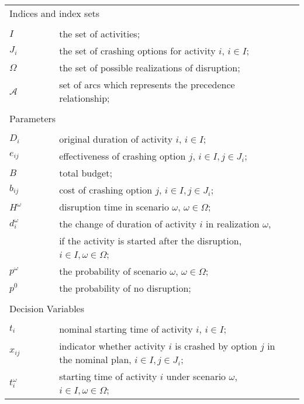 \documentclass[11pt]{article}
\begin{document}
	\begin{table}[H]
		\begin{tabular}{ l l l l }
			\multicolumn{4}{l}{Indices and index sets} \\
			\\
			\(I\) & \(\qquad\) & the set of activities;&\\
			\(J_i\) & \(\qquad\) & the set of crashing options for activity \(i\), \(i \in I\);&\\
			\(\Omega\) & \(\qquad\) & the set of possible realizations of disruption;&\\
			\(\mathcal{A}\) &\(\qquad\) & set of arcs which represents the precedence relationship;&\\
			\\
			\multicolumn{4}{l}{Parameters} \\
			\\
			\(D_{i}\)& \(\qquad\) & original duration of activity \(i\), \(i \in I\);&\\
			\(e_{ij}\) & \(\qquad\) & effectiveness of crashing option \(j\), \(i \in I, j \in J_i\);&\\
			\(B\) & \(\qquad\) & total budget;&\\
			\(b_{ij}\) & \(\qquad\) & cost of crashing option \(j\), \(i \in I, j \in J_i\);&\\
			\(H^\omega\) &\(\qquad\) & disruption time in scenario \(\omega\), \(\omega \in \Omega\);&\\
			\(d_{i}^\omega\) & \(\qquad\)&the change of duration of activity \(i\) in realization \(\omega\), &\\
			& \(\qquad\) & if the activity is started after the disruption, \(i \in I, \omega \in \Omega\);& \\
			\(p^\omega\) & \(\qquad\) & the probability of scenario \(\omega\), \(\omega \in \Omega\);& \\
			\(p^0\) & \(\qquad\) & the probability of no disruption;& \\
			\\
			\multicolumn{4}{l}{Decision Variables}\\
			\\
			\(t_{i}\) & \(\qquad\) & nominal starting time of activity \(i\), \(i \in I\);&\\
			\(x_{ij}\) & \(\qquad\) & indicator whether activity \(i\) is crashed by option \(j\) in the nominal plan, \(i \in I, j \in J_i\); &\\
			\(t_{i}^\omega\) & \(\qquad\) & starting time of activity \(i\) under scenario \(\omega\), \(i \in I, \omega \in \Omega\);&\\

\end{tabular}
\end{table}
\end{document}
